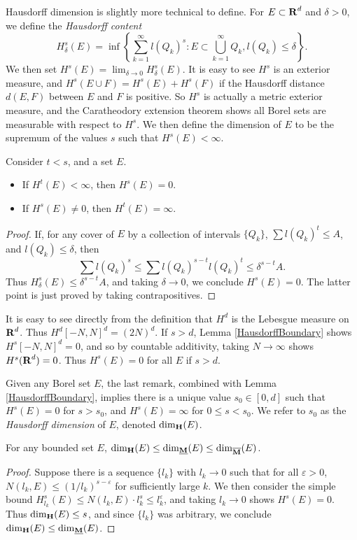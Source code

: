 Hausdorff dimension is slightly more technical to define. For $E \subset \operatorname{\mathbf{R}}^d$ and $\delta > 0$, we define the \emph{Hausdorff content}
%
\[ H_\delta^s(E) = \inf \left\{ \sum_{k = 1}^\infty l(Q_k)^s : E \subset \bigcup_{k = 1}^\infty Q_k, l(Q_k) \leq \delta \right\}. \]
%
We then set $H^s(E) = \lim_{\delta \to 0} H_\delta^s(E)$. It is easy to see $H^s$ is an exterior measure, and $H^s(E \cup F) = H^s(E) + H^s(F)$ if the Hausdorff distance $d(E,F)$ between $E$ and $F$ is positive. So $H^s$ is actually a metric exterior measure, and the Caratheodory extension theorem shows all Borel sets are measurable with respect to $H^s$. We then define the dimension of $E$ to be the supremum of the values $s$ such that $H^s(E) < \infty$.

\begin{lemma} \label{HausdorffBoundary}
	Consider $t < s$, and a set $E$.
	\begin{itemize}
		\item If $H^t(E) < \infty$, then $H^s(E) = 0$.
		\item If $H^s(E) \neq 0$, then $H^t(E) = \infty$.
	\end{itemize}
\end{lemma}
\begin{proof}
	If, for any cover of $E$ by a collection of intervals $\{ Q_k \}$, $\sum l(Q_k)^t \leq A$, and $l(Q_k) \leq \delta$, then
	\[ \sum l(Q_k)^s \leq \sum l(Q_k)^{s-t} l(Q_k)^t \leq \delta^{s-t} A. \]
	Thus $H^s_\delta(E) \leq \delta^{s-t} A$, and taking $\delta \to 0$, we conclude $H^s(E) = 0$. The latter point is just proved by taking contrapositives.
\end{proof}

\begin{remark}
	It is easy to see directly from the definition that $H^d$ is the Lebesgue measure on $\operatorname{\mathbf{R}}^d$. Thus $H^d[-N,N]^d = (2N)^d$. If $s > d$, Lemma \ref{HausdorffBoundary} shows $H^s[-N,N]^d = 0$, and so by countable additivity, taking $N \to \infty$ shows $H^s(\operatorname{\mathbf{R}}^d) = 0$. Thus $H^s(E) = 0$ for all $E$ if $s > d$.
\end{remark}

Given any Borel set $E$, the last remark, combined with Lemma \ref{HausdorffBoundary}, implies there is a unique value $s_0 \in [0,d]$ such that $H^s(E) = 0$ for $s > s_0$, and $H^s(E) = \infty$ for $0 \leq s < s_0$. We refer to $s_0$ as the \emph{Hausdorff dimension} of $E$, denoted $\operatorname{\dim_{\mathbf{H}}}(E)$.

\begin{theorem}
	For any bounded set $E$, $\operatorname{\dim_{\mathbf{H}}}(E) \leq \operatorname{\dim_{\underline{\mathbf{M}}}}(E) \leq \operatorname{\dim_{\overline{\mathbf{M}}}}(E)$.
\end{theorem}
\begin{proof}
	Suppose there is a sequence $\{ l_k \}$ with $l_k \to 0$ such that for all $\varepsilon > 0$, $N(l_k,E) \leq (1/l_k)^{s - \varepsilon}$ for sufficiently large $k$. We then consider the simple bound $H^s_{l_k}(E) \leq N(l_k,E) \cdot l_k^s \leq l_k^\varepsilon$, and taking $l_k \to 0$ shows $H^s(E) = 0$. Thus $\operatorname{\dim_{\mathbf{H}}}(E) \leq s$, and since $\{ l_k \}$ was arbitrary, we conclude $\operatorname{\dim_{\mathbf{H}}}(E) \leq \operatorname{\dim_{\underline{\mathbf{M}}}}(E)$.
\end{proof}

